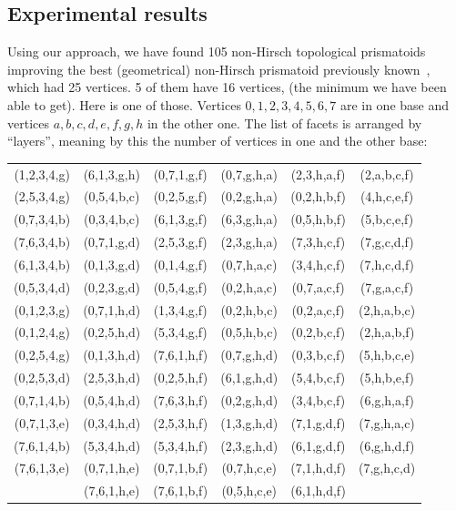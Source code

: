 \documentclass[12pt,a4paper]{article}
\theoremstyle{plain}
\theoremstyle{definition}
\begin{document}
\subsection{Experimental results}
Using our approach, we have found 105 non-Hirsch topological prismatoids improving
the best (geometrical) non-Hirsch prismatoid previously known~\cite{improvement}, which had 25 vertices. 5 of them have 16 vertices, (the minimum we have been able to get). Here is one of those. Vertices $0,1,2,3,4,5,6,7$ are in one base and vertices $a,b,c,d,e,f,g,h$ in the other one. The list of facets is arranged by ``layers'', meaning by this the number of vertices in one and the other base:

\begin{tabular} {c|cc|cc|c}
(1,2,3,4,g) & (6,1,3,g,h) & (0,7,1,g,f) & (0,7,g,h,a) & (2,3,h,a,f) & (2,a,b,c,f) \\
(2,5,3,4,g) & (0,5,4,b,c) & (0,2,5,g,f) & (0,2,g,h,a) & (0,2,h,b,f) & (4,h,c,e,f) \\
(0,7,3,4,b) & (0,3,4,b,c) & (6,1,3,g,f) & (6,3,g,h,a) & (0,5,h,b,f) & (5,b,c,e,f) \\
(7,6,3,4,b) & (0,7,1,g,d) & (2,5,3,g,f) & (2,3,g,h,a) & (7,3,h,c,f) & (7,g,c,d,f) \\
(6,1,3,4,b) & (0,1,3,g,d) & (0,1,4,g,f) & (0,7,h,a,c) & (3,4,h,c,f) & (7,h,c,d,f) \\
(0,5,3,4,d) & (0,2,3,g,d) & (0,5,4,g,f) & (0,2,h,a,c) & (0,7,a,c,f) & (7,g,a,c,f) \\
(0,1,2,3,g) & (0,7,1,h,d) & (1,3,4,g,f) & (0,2,h,b,c) & (0,2,a,c,f) & (2,h,a,b,c) \\
(0,1,2,4,g) & (0,2,5,h,d) & (5,3,4,g,f) & (0,5,h,b,c) & (0,2,b,c,f) & (2,h,a,b,f) \\
(0,2,5,4,g) & (0,1,3,h,d) & (7,6,1,h,f) & (0,7,g,h,d) & (0,3,b,c,f) & (5,h,b,c,e) \\
(0,2,5,3,d) & (2,5,3,h,d) & (0,2,5,h,f) & (6,1,g,h,d) & (5,4,b,c,f) & (5,h,b,e,f) \\
(0,7,1,4,b) & (0,5,4,h,d) & (7,6,3,h,f) & (0,2,g,h,d) & (3,4,b,c,f) & (6,g,h,a,f) \\
(0,7,1,3,e) & (0,3,4,h,d) & (2,5,3,h,f) & (1,3,g,h,d) & (7,1,g,d,f) & (7,g,h,a,c) \\
(7,6,1,4,b) & (5,3,4,h,d) & (5,3,4,h,f) & (2,3,g,h,d) & (6,1,g,d,f) & (6,g,h,d,f) \\
(7,6,1,3,e) & (0,7,1,h,e) & (0,7,1,b,f) & (0,7,h,c,e) & (7,1,h,d,f) & (7,g,h,c,d) \\
            & (7,6,1,h,e) & (7,6,1,b,f) & (0,5,h,c,e) & (6,1,h,d,f) &             \\

\end{tabular}
\end{document}
